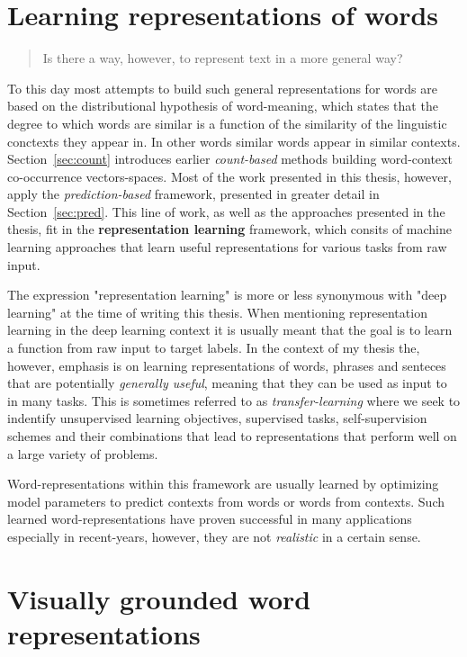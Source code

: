 \section{Learning representations of words}

\begin{quote}
Is there a way, however, to represent text in a more general way?
\end{quote}

To this day most attempts to build such general representations for words are based on the 
distributional hypothesis of word-meaning, which states that the degree to which words are similar 
is a function of the similarity of the linguistic conctexts they appear in. In other words similar 
words appear in similar contexts. Section~\ref{sec:count} introduces earlier \emph{count-based} 
methods building word-context co-occurrence vectors-spaces. 
Most of the work presented in this thesis, however, apply the \emph{prediction-based} framework,
presented in greater detail in Section~\ref{sec:pred}. 
This line of work, as well as the approaches presented in the thesis, fit in the \textbf{representation learning} 
framework, which consits of machine learning approaches that learn useful representations for various tasks from raw input.

The expression "representation learning" is more or less synonymous with "deep learning" at the time
of writing this thesis. When mentioning representation learning in the deep learning context
it is usually meant that the goal is to learn a function from raw input to target labels. In the 
context of my thesis the, however, emphasis is on learning representations of words, phrases and 
senteces that are potentially \emph{generally useful}, meaning 
that they can be used as input to in many tasks. This is sometimes referred to as 
\emph{transfer-learning} where we seek to indentify unsupervised learning objectives, 
supervised tasks, self-supervision schemes and their combinations that lead to representations that
perform well on a large variety of problems. 

Word-representations within this framework are usually learned by
optimizing model parameters to predict contexts from words or words from contexts.
Such learned word-representations have proven successful in many applications especially 
in recent-years, however, they are not \emph{realistic} in a certain sense. 

\section{Visually grounded word representations}

